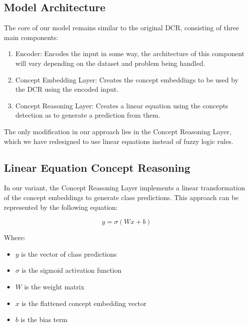 \documentclass[sigconf, nonacm]{acmart}
\begin{document}
\subsection{Model Architecture}
\vspace{2pt}
The core of our model remains similar to the original DCR, consisting of three main components: \vspace{4pt}
\begin{enumerate}
    \item Encoder: Encodes the input in some way, the architecture of this component will vary depending on the dataset and problem being handled.\vspace{8pt}
    \item Concept Embedding Layer: Creates the concept embeddings to be used by the DCR using the encoded input.\vspace{8pt}
    \item Concept Reasoning Layer: Creates a linear equation using the concepts detection as to generate a prediction from them.\vspace{8pt}
\end{enumerate}
The only modification in our approach lies in the Concept Reasoning Layer, which we have redesigned to use linear equations instead of fuzzy logic rules. \vspace{6pt}

\subsection{Linear Equation Concept Reasoning}
\vspace{2pt}
In our variant, the Concept Reasoning Layer implements a linear transformation of the concept embeddings to generate class predictions. This approach can be represented by the following equation:

\begin{equation}
    y = \sigma(Wx + b)
\end{equation}

Where:
\begin{itemize}
    \item $y$ is the vector of class predictions
    \item $\sigma$ is the sigmoid activation function
    \item $W$ is the weight matrix
    \item $x$ is the flattened concept embedding vector
    \item $b$ is the bias term \vspace{8pt}
\end{itemize}
\end{document}
